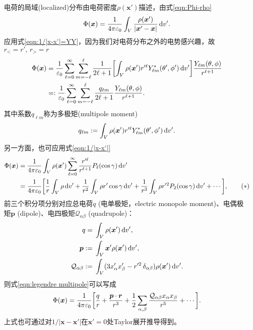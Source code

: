 电荷的局域(localized)分布由电荷密度$\rho(\bm x')$描述，由式\eqref{eqn:Phi-rho}
\[
    \Phi(\bm x)=\frac1{4\pi\varepsilon_0}\int_V\frac{\rho(\bm x')}{|\bm x'-\bm x|}\mathop{}\!\mathrm{d} v'.
\]
应用式\eqref{eqn:1/|x-x'|=YY}，因为我们对电荷分布之外的电势感兴趣，故$r_<=r',\,r_>=r$
\begin{align}
    \notag
    \Phi(\bm x)&=\frac1{\varepsilon_0}\sum_{\ell=0}^\infty\sum_{m=-\ell}^\ell\frac1{2\ell+1}\biggl[\int_V\rho(\bm x'){r'^\ell}Y^\ast_{\ell m}(\theta',\phi')\mathop{}\!\mathrm{d} v'\biggr]\frac{Y_{\ell m}(\theta,\phi)}{r^{\ell+1}}\\
    \label{eqn:Phi multipole}
    &=:\frac1{\varepsilon_0}\sum_{\ell=0}^\infty\sum_{m=-\ell}^\ell\frac{q_{\ell m}}{2\ell+1}\frac{Y_{\ell m}(\theta,\phi)}{r^{\ell+1}}.
\end{align}
其中系数$q_{\ell m}$称为多极矩(multipole moment)
\begin{equation}
    q_{\ell m}:=\int_V\rho(\bm x'){r'^\ell}Y^\ast_{\ell m}(\theta',\phi')\mathop{}\!\mathrm{d} v'.
\end{equation}
另一方面，也可应用式\eqref{eqn:1/|x-x'|}
\begin{align}
    \notag
    \Phi(\bm x)&=\frac1{4\pi\varepsilon_0}\int_V\rho(\bm x')\sum_{\ell=0}^\infty\frac{r'^\ell}{r^{\ell+1}}P_\ell(\cos\gamma)\mathop{}\!\mathrm{d} v'\\
    \label{eqn:legendre multipole}
    &=\frac1{4\pi\varepsilon_0}\biggl[\frac1r\int_V\rho\mathop{}\!\mathrm{d} v'+\frac1{r^2}\int_V\rho r'\cos\gamma\mathop{}\!\mathrm{d} v'+\frac1{r^3}\int_V\rho r'^2P_2(\cos\gamma)\mathop{}\!\mathrm{d} v'+\cdots\biggr],\tag{$\ast$}
\end{align}
前三个积分项分别对应总电荷$q$ (电单极矩，electric monopole moment)、电偶极矩$\bm p$ (dipole)、电四极矩$\mathcal Q_{\alpha\beta}$ (quadrupole)：
\begin{align}
    \notag
    q={}&\int_V\rho(\bm x')\mathop{}\!\mathrm{d} v',\\
    \bm p:={}&\int_V\bm x'\rho(\bm x')\mathop{}\!\mathrm{d} v',\\
    \mathcal Q_{\alpha\beta}:={}&\int_V(3x_\alpha'x_\beta'-r'^2\mathop{}\!\delta_{\alpha\beta})\rho(\bm x')\mathop{}\!\mathrm{d} v'.
\end{align}
则式\eqref{eqn:legendre multipole}可以写成 
\begin{equation}
    \Phi(\bm x)=\frac1{4\pi\varepsilon_0}\biggl[\frac qr+\frac{\bm p\cdot\bm r}{r^3}+\frac12\sum_{\alpha,\beta}\frac{\mathcal Q_{\alpha\beta}x_\alpha x_\beta}{r^5}+\cdots\biggr].
\end{equation}
上式也可通过对$1/|\bm x-\bm x'|$在$\bm x'=0$处Taylor展开推导得到。

~

